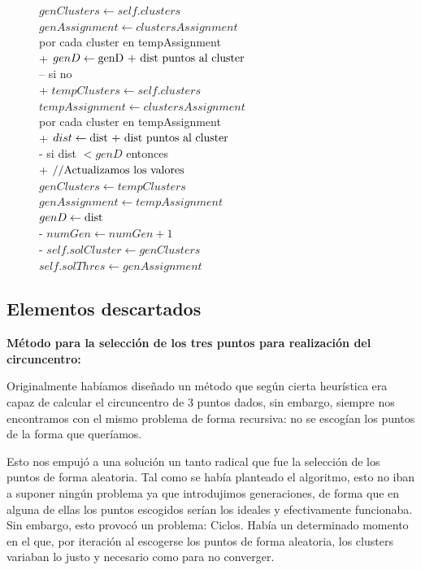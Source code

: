 \documentclass[conference,a4paper]{IEEEtran}
\begin{document}
\begin{figure}[H]
\begin{pseudo}
\(genClusters \leftarrow self.clusters\)\\
\(genAssignment \leftarrow clustersAssignment\)\\
por cada \textnormal{cluster en tempAssignment}\\+
\( genD \leftarrow \textnormal{genD + dist puntos al cluster}\) \\--
si no\\+
\(tempClusters \leftarrow self.clusters\)\\
\(tempAssignment \leftarrow clustersAssignment\)\\
por cada \textnormal{cluster en tempAssignment}\\+
\( dist \leftarrow \textnormal{dist + dist puntos al cluster}\) \\-
si \textnormal{dist $<genD$} entonces\\+
\( \textnormal{//Actualizamos los valores} \)\\
\(genClusters \leftarrow tempClusters\)\\
\(genAssignment \leftarrow tempAssignment\)\\
\( genD \leftarrow \textnormal{dist}\)\\-
\( numGen \leftarrow numGen + 1\)\\-
\(self.solCluster \leftarrow genClusters \) \\
\(self.solThres \leftarrow genAssignment \)
\end{pseudo}
\end{figure}

\newpage
\subsection{Elementos descartados}

\textbf{Método para la selección de los tres puntos para realización del circuncentro:}

Originalmente habíamos diseñado un método que según cierta heurística era capaz de calcular el circuncentro de 3 puntos dados, sin embargo, siempre nos encontramos con el mismo problema de forma recursiva: no se escogían los puntos de la forma que queríamos.

Esto nos empujó a una solución un tanto radical que fue la selección de los puntos de forma aleatoria. Tal como se había planteado el algoritmo, esto no iban a suponer ningún problema ya que introdujimos generaciones, de forma que en alguna de ellas los puntos escogidos serían los ideales y efectivamente funcionaba.
Sin embargo, esto provocó un problema: Ciclos. Había un determinado momento en el que, por iteración al escogerse los puntos de forma aleatoria, los clusters variaban lo justo y necesario como para no converger.
\end{document}
